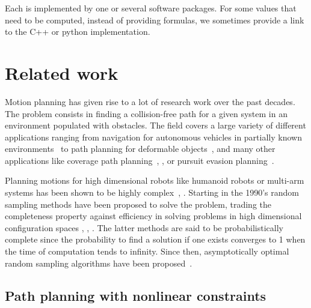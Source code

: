Each \partie is implemented by one or several software packages. For some values that need to be computed, instead of providing formulas, we sometimes provide a link to the C++ or python implementation.

\section{Related work}\label{sec:related-work}

Motion planning has given rise to a lot of research work over the past decades.
The problem consists in finding a collision-free path for a given system in
an environment populated with obstacles. The field covers a large variety of
different applications ranging from navigation for autonomous vehicles in
partially known environments~\cite{DarpaUrbanChallenge} to path planning for
deformable objects~\cite{LamKav2001}, \cite{RouFerTai2020} and many other applications like coverage path planning~\cite{coverage2001}, \cite{coverage2013}, or pursuit evasion planning~\cite{pursuit-evasion1999}.

Planning motions for high dimensional robots like humanoid robots or multi-arm
systems has been shown to be highly complex~\cite{SchSha1983}, \cite{Canny1983}. Starting in the 1990's random sampling methods have been proposed
to solve the problem, trading the completeness property against efficiency in
solving problems in high dimensional configuration spaces \cite{KSLO1996}, \cite{HsuLatMot99}, \cite{KufLav00}. The latter methods are said to be probabilistically complete since the probability to find a solution if one exists converges to 1 when the time of computation tends to infinity. Since then, asymptotically optimal random sampling algorithms have
been proposed~\cite{KarFra2011}.

\subsection{Path planning with nonlinear constraints}


